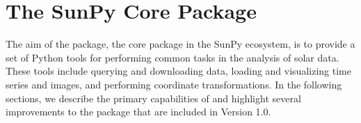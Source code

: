 \section{The SunPy Core Package}
\label{sec:sunpycore}

The aim of the \sunpypkg package, the core package in the SunPy ecosystem, is to provide a set of Python tools for performing common tasks in the analysis of solar data.
These tools include querying and downloading data, loading and visualizing time series and images, and performing coordinate transformations.
In the following sections, we describe the primary capabilities of \sunpypkg and highlight several improvements to the package that are included in Version 1.0.
